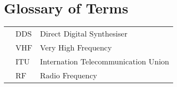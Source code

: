 \chapter*{Glossary of Terms}

\begin{tabular}{p{0.8cm}p{2.5cm}l}
&DDS		& Direct Digital Synthesiser\\
&VHF		& Very High Frequency \\
&ITU		& Internation Telecommunication Union \\
&RF		& Radio Frequency \\




\end{tabular}
